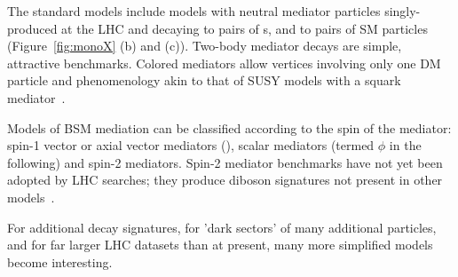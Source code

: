 
The standard models include models with neutral mediator particles singly-produced at the LHC and decaying to pairs of {\IP}s, and to pairs of SM particles (Figure~\ref{fig:monoX} (b) and (c)). Two-body mediator decays are simple, attractive benchmarks. Colored mediators allow vertices involving only one DM particle and phenomenology akin to that of SUSY models with a squark mediator~\cite{Papucci:2014iwa,An:2013xka,Bell:2012rg}. 

Models of BSM mediation can be classified according to the spin of the mediator: spin-1 vector or axial vector mediators (\Zprime), scalar mediators (termed $\phi$ in the following) and spin-2 mediators. Spin-2 mediator benchmarks have not yet been adopted by LHC searches; they produce diboson signatures not present in other models~\cite{Han:2015cty}. %

For additional decay signatures, for 'dark sectors' of many additional particles, and for far larger LHC datasets than at present, many more simplified models become interesting. 



